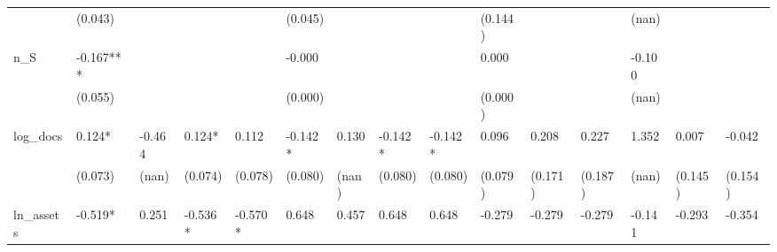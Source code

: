 \begin{table}
\begin{center}
\begin{tabular}{lllllllllllllll}
                  & (0.043)            &                    &                        &                     & (0.045)              &                      &                          &                       & (0.144)              &                          &                       & (nan)                         &                                           &                                         \\
n\_S              & -0.167***          &                    &                        &                     & -0.000               &                      &                          &                       & 0.000                &                          &                       & -0.100                        &                                           &                                         \\
                  & (0.055)            &                    &                        &                     & (0.000)              &                      &                          &                       & (0.000)              &                          &                       & (nan)                         &                                           &                                         \\
log\_docs         & 0.124*             & -0.464             & 0.124*                 & 0.112               & -0.142*              & 0.130                & -0.142*                  & -0.142*               & 0.096                & 0.208                    & 0.227                 & 1.352                         & 0.007                                     & -0.042                                  \\
                  & (0.073)            & (nan)              & (0.074)                & (0.078)             & (0.080)              & (nan)                & (0.080)                  & (0.080)               & (0.079)              & (0.171)                  & (0.187)               & (nan)                         & (0.145)                                   & (0.154)                                 \\
ln\_assets        & -0.519*            & 0.251              & -0.536*                & -0.570*             & 0.648                & 0.457                & 0.648                    & 0.648                 & -0.279               & -0.279                   & -0.279                & -0.141                        & -0.293                                    & -0.354                                  \\

\end{tabular}
\end{center}
\end{table}
